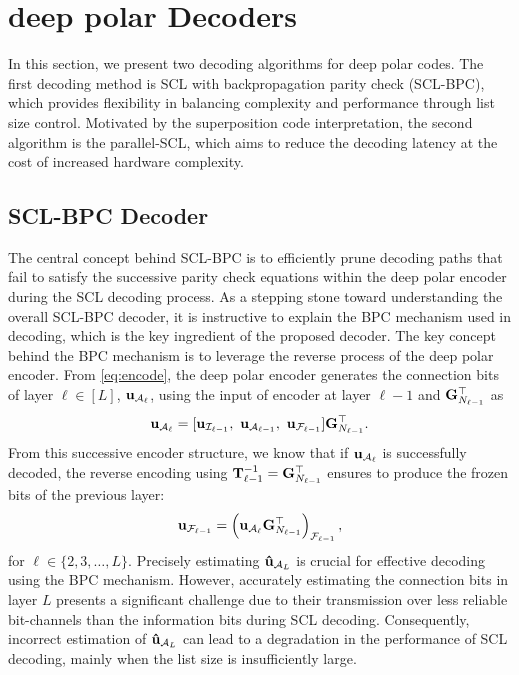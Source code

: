 \documentclass[conference]{IEEEtran}
\begin{document}
 
\section{deep polar Decoders}
In this section, we present two decoding algorithms for deep polar codes. The first decoding method is SCL with backpropagation parity check (SCL-BPC), which provides flexibility in balancing complexity and performance through list size control. Motivated by the superposition code interpretation, the second algorithm is the parallel-SCL, which aims to reduce the decoding latency at the cost of increased hardware complexity. 



\subsection{SCL-BPC Decoder}


 The central concept behind SCL-BPC is to efficiently prune decoding paths that fail to satisfy the successive parity check equations within the deep polar encoder during the SCL decoding process.  As a stepping stone toward understanding the overall SCL-BPC decoder, it is instructive to explain the BPC mechanism used in decoding, which is the key ingredient of the proposed decoder. The key concept behind the BPC mechanism is to leverage the reverse process of the deep polar encoder. From \eqref{eq:encode}, the deep polar encoder generates the connection bits of layer $\ell\in [L]$, ${\bf u}_{\mathcal{A}_{\ell}}$, using the input of encoder at layer $\ell-1$ and ${\bf G}_{N_{\ell-1}}^{\top}$ as 
\begin{align}
	{\bf u}_{\mathcal{A}_{\ell}}=[  {\bf u}_{\mathcal{I}_{\ell-1}},~ {\bf u}_{\mathcal{A}_{\ell-1}},~{\bf u}_{\mathcal{F}_{\ell-1}} ] {\bf G}_{N_{\ell-1}}^{\top}.
\end{align} 
 From this successive encoder structure, we know that if ${\bf u}_{\mathcal{A}_{\ell}}$ is successfully decoded, the reverse encoding using ${\bf T}_{\ell-1}^{-1}={\bf G}_{N_{\ell-1}}^{\top}$ ensures to produce the frozen bits of the previous layer:
 \begin{align}
 	{\bf u}_{\mathcal{F}_{\ell-1}} =	\left({\bf u}_{\mathcal{A}_{\ell}}{\bf G}_{N_{\ell-1}}^{\top} \right)_{{\mathcal{F}_{\ell-1}}},
 \end{align}
 for $\ell\in \{2,3,\ldots, L\}$. Precisely estimating ${\bf \hat u}_{\mathcal{A}_{L}}$ is crucial for effective decoding using the BPC mechanism. However, accurately estimating the connection bits in layer $L$ presents a significant challenge due to their transmission over less reliable bit-channels than the information bits during SCL decoding. Consequently, incorrect estimation of ${\bf \hat u}_{\mathcal{A}_{L}}$ can lead to a degradation in the performance of SCL decoding, mainly when the list size is insufficiently large.
\end{document}
